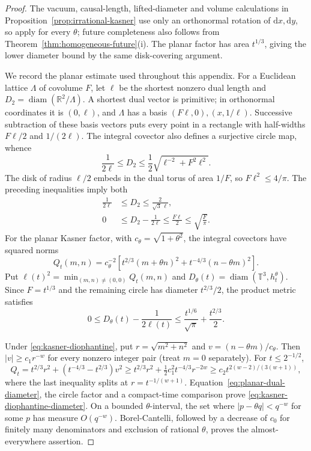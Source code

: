 \documentclass[10pt,a4paper]{article}
\numberwithin{equation}{section}
\theoremstyle{definition}
\theoremstyle{remark}
\newcommand{\R}{\mathbb R}
\newcommand{\dd}{\mathrm d}
\newcommand{\diam}{\operatorname{diam}}
\begin{document}
\begin{proof}
The vacuum, causal-length, lifted-diameter and volume calculations in
Proposition~\ref{prop:irrational-kasner} use only an orthonormal
rotation of $\dd x,\dd y$, so apply for every $\theta$; future
completeness also follows from
Theorem~\ref{thm:homogeneous-future}\textup{(i)}.
The planar factor has area $t^{1/3}$, giving the lower diameter
bound by the same disk-covering argument.

We record the planar estimate used throughout this appendix.  For a
Euclidean lattice $\Lambda$ of covolume $F$, let $\ell$ be the
shortest nonzero dual length and $D_2=\diam(\R^2/\Lambda)$.
A shortest dual vector is primitive; in orthonormal coordinates it
is $(0,\ell)$, and $\Lambda$ has a basis
$(F\ell,0),(x,1/\ell)$.  Successive subtraction of these basis
vectors puts every point in a rectangle with half-widths
$F\ell/2$ and $1/(2\ell)$.  The integral covector also defines a
surjective circle map, whence
\[
 \frac1{2\ell}\le D_2
 \le\frac12\sqrt{\ell^{-2}+F^2\ell^2}.
\]
The disk of radius $\ell/2$ embeds in the dual torus of area $1/F$,
so $F\ell^2\le4/\pi$.  The preceding inequalities imply both
\begin{align}
 \frac1{2\ell}&\le D_2\le\frac2{\sqrt3\,\ell},
 \label{eq:planar-dual-diameter}\\
 0&\le D_2-\frac1{2\ell}\le\frac{F\ell}{2}
       \le\sqrt{\frac F\pi}.
 \label{eq:planar-sharp-diameter-error}
\end{align}
For the planar Kasner factor, with $c_\theta=\sqrt{1+\theta^2}$,
the integral covectors have squared norms
\begin{equation}
 Q_t(m,n)=c_\theta^{-2}
 \left[t^{2/3}(m+\theta n)^2+t^{-4/3}(n-\theta m)^2\right].
 \label{eq:kasner-dual-quadratic}
\end{equation}
Put $\ell(t)^2=\min_{(m,n)\ne(0,0)}Q_t(m,n)$ and
$D_\theta(t)=\diam(\mathbb T^3,h_t^\theta)$.  Since $F=t^{1/3}$
and the remaining circle has diameter $t^{2/3}/2$, the product metric
satisfies
\begin{equation}
 0\le D_\theta(t)-\frac1{2\ell(t)}
 \le\frac{t^{1/6}}{\sqrt\pi}+\frac{t^{2/3}}2.
 \label{eq:kasner-diameter-dual-error}
\end{equation}

Under \eqref{eq:kasner-diophantine}, put
$r=\sqrt{m^2+n^2}$ and $v=(n-\theta m)/c_\theta$.
Then $|v|\ge c_1r^{-w}$ for every nonzero integer pair (treat
$m=0$ separately).  For $t\le2^{-1/2}$,
\[
 Q_t=t^{2/3}r^2+(t^{-4/3}-t^{2/3})v^2
 \ge t^{2/3}r^2+\tfrac12c_1^2t^{-4/3}r^{-2w}
 \ge c_2t^{2(w-2)/(3(w+1))},
\]
where the last inequality splits at $r=t^{-1/(w+1)}$.
Equation~\eqref{eq:planar-dual-diameter}, the circle factor and a
compact-time comparison prove \eqref{eq:kasner-diophantine-diameter}.
On a bounded $\theta$-interval, the set where
$|p-\theta q|<q^{-w}$ for some $p$ has measure $O(q^{-w})$.
Borel-Cantelli, followed by a decrease of $c_0$ for finitely many
denominators and exclusion of rational $\theta$, proves the
almost-everywhere assertion.


\end{proof}
\end{document}
